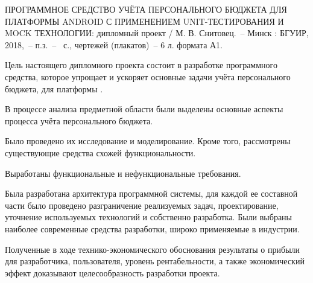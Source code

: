 \thispagestyle{empty}


\MakeUppercase{Программное средство учёта персонального бюджета для платформы Android с применением Unit-\-тес\-ти\-ро\-ва\-ния и Mock технологии}: дипломный проект / М. В. Снитовец.~-- Минск : БГУИР, 2018,~-- п.з.~-- \totalpages~с., чертежей (плакатов)~-- 6 л. формата А1.
\vspace{\baselineskip}

Цель настоящего дипломного проекта состоит в  разработке программного средства, которое упрощает и ускоряет основные задачи учёта персонального бюджета, для платформы \andro.

В процессе анализа предметной области были выделены основные аспекты процесса учёта персонального бюджета.

Было проведено их исследование и моделирование.
Кроме того, рассмотрены существующие средства схожей функциональности.

Выработаны функциональные и нефункциональные требования.

Была разработана архитектура программной системы, для каждой ее составной части было проведено разграничение реализуемых задач, проектирование, уточнение используемых технологий и собственно разработка.
Были выбраны наиболее современные средства разработки, широко применяемые в индустрии.

Полученные в ходе технико-экономического обоснования результаты о прибыли для разработчика, пользователя, уровень рентабельности, а также экономический эффект доказывают целесообразность разработки про\-екта.
